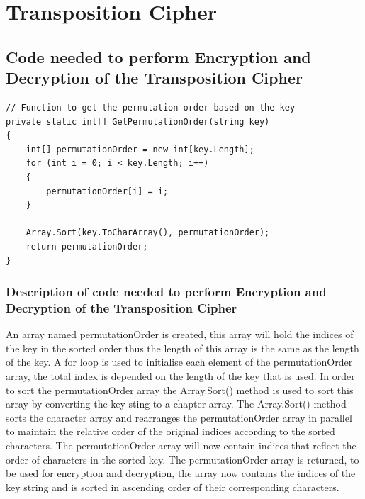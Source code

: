 \documentclass[a4paper,oneside,11pt]{book}
\begin{document}
\chapter[Transposition Cipher]{Transposition Cipher}

\section{Code needed to perform Encryption and Decryption of the Transposition Cipher}
\begin{lstlisting}[language=Csh, caption={Code for Transposition Cipher}]
// Function to get the permutation order based on the key
private static int[] GetPermutationOrder(string key)
{
    int[] permutationOrder = new int[key.Length];
    for (int i = 0; i < key.Length; i++)
    {
        permutationOrder[i] = i;
    }

    Array.Sort(key.ToCharArray(), permutationOrder);
    return permutationOrder;
}
\end{lstlisting}

\subsection{Description of code needed to perform Encryption and Decryption of the Transposition Cipher}
An array named permutationOrder is created, this array will hold the indices of the key in the sorted order thus the length of this array is the same as the length of the key. A for loop is used to initialise each element of the permutationOrder array, the total index is depended on the length of the key that is used. In order to sort the permutationOrder array the Array.Sort() method is used to sort this array by converting the key sting to a chapter array. The Array.Sort() method sorts the character array and rearranges the permutationOrder array in parallel to maintain the relative order of the original indices according to the sorted characters. The permutationOrder array will now contain indices that reflect the order of characters in the sorted key. The permutationOrder array is returned, to be used for encryption and decryption, the array now contains the indices of the key string and is sorted in ascending order of their corresponding characters.
\end{document}
